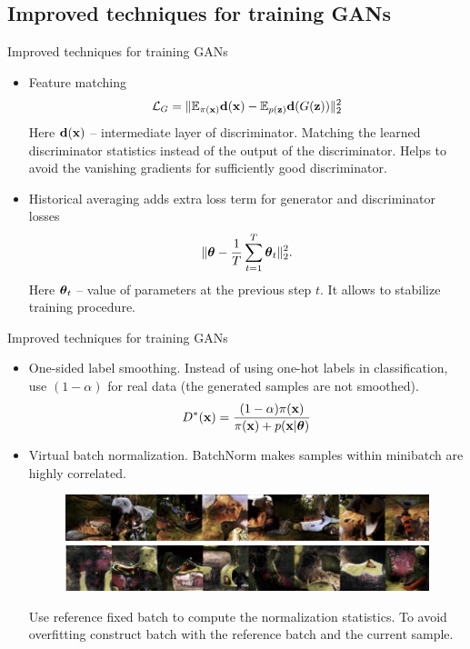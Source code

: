\documentclass{beamer}
\begin{document}
\subsection{Improved techniques for training GANs}
\begin{frame}{Improved techniques for training GANs}
	\begin{itemize}
		\item Feature matching
		\[
			\mathcal{L}_G = \| \mathbb{E}_{\pi(\mathbf{x})} \mathbf{d}(\mathbf{x}) - \mathbb{E}_{p(\mathbf{z})} \mathbf{d}(G(\mathbf{z})) \|_2^2
		\]
		Here $\mathbf{d}(\mathbf{x})$ -- intermediate layer of discriminator. Matching the learned discriminator statistics instead of the output of the discriminator. Helps to avoid the vanishing gradients for sufficiently good discriminator.
		\item Historical averaging adds extra loss term for generator and discriminator losses
		\vspace{-0.2cm}
		\[
		 \| \boldsymbol{\theta} - \frac{1}{T}\sum_{t=1}^T \boldsymbol{\theta}_t\|^2_2.
		\]
		Here $\boldsymbol{\theta}_t$ -- value of parameters at the previous step $t$. It allows to stabilize training procedure.
	\end{itemize}
\end{frame}
\begin{frame}{Improved techniques for training GANs}
	\begin{itemize}
		\item One-sided label smoothing. Instead of using one-hot labels in classification, use $(1 - \alpha)$ for real data (the generated samples are not smoothed).
		\[
			D^*(\mathbf{x}) = \frac{(1 - \alpha )\pi(\mathbf{x})}{\pi(\mathbf{x}) + p(\mathbf{x} | \boldsymbol{\theta})}
		\]
		\item Virtual batch normalization. BatchNorm makes samples within minibatch are highly correlated.
		\begin{figure}
			\centering
			\includegraphics[width=0.6\linewidth]{figs/virtual_batch_norm}
		\end{figure}
	Use reference fixed batch to compute the normalization statistics. To avoid overfitting construct batch with the reference batch and the current sample. 
	\end{itemize}
\end{frame}
\end{document}
